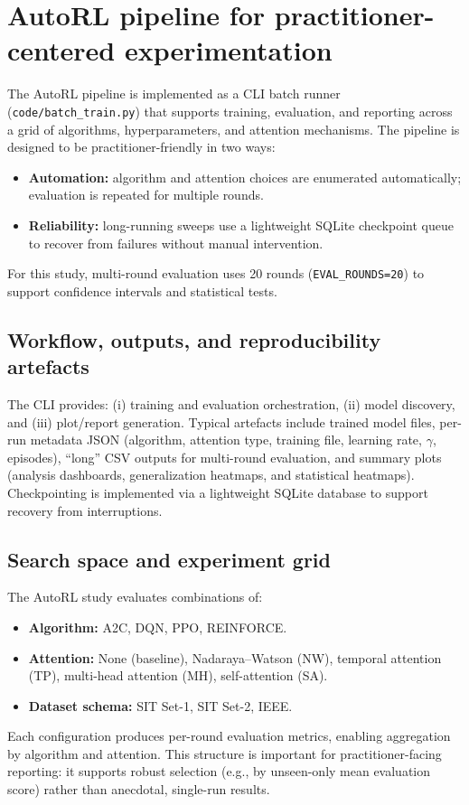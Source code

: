 \documentclass[11pt]{article}
\begin{document}
\section{AutoRL pipeline for practitioner-centered experimentation}
\label{sec:autorl}
The AutoRL pipeline is implemented as a CLI batch runner (\texttt{code/batch\_train.py}) that supports training, evaluation, and reporting across a grid of algorithms, hyperparameters, and attention mechanisms. The pipeline is designed to be practitioner-friendly in two ways:
\begin{itemize}
	\item \textbf{Automation:} algorithm and attention choices are enumerated automatically; evaluation is repeated for multiple rounds.
	\item \textbf{Reliability:} long-running sweeps use a lightweight SQLite checkpoint queue to recover from failures without manual intervention.
\end{itemize}
For this study, multi-round evaluation uses 20 rounds (\texttt{EVAL\_ROUNDS=20}) to support confidence intervals and statistical tests.

\subsection{Workflow, outputs, and reproducibility artefacts}
The CLI provides: (i) training and evaluation orchestration, (ii) model discovery, and (iii) plot/report generation. Typical artefacts include trained model files, per-run metadata JSON (algorithm, attention type, training file, learning rate, $\gamma$, episodes), ``long'' CSV outputs for multi-round evaluation, and summary plots (analysis dashboards, generalization heatmaps, and statistical heatmaps). Checkpointing is implemented via a lightweight SQLite database to support recovery from interruptions.

\subsection{Search space and experiment grid}
The AutoRL study evaluates combinations of:
\begin{itemize}
	\item \textbf{Algorithm:} A2C, DQN, PPO, REINFORCE.
	\item \textbf{Attention:} None (baseline), Nadaraya--Watson (NW), temporal attention (TP), multi-head attention (MH), self-attention (SA).
	\item \textbf{Dataset schema:} SIT Set-1, SIT Set-2, IEEE.
\end{itemize}
Each configuration produces per-round evaluation metrics, enabling aggregation by algorithm and attention. This structure is important for practitioner-facing reporting: it supports robust selection (e.g., by unseen-only mean evaluation score) rather than anecdotal, single-run results.
\end{document}
